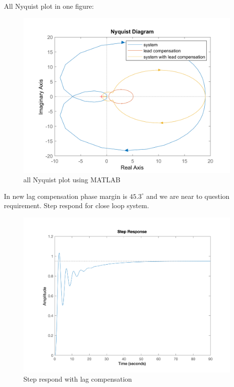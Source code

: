 All Nyquist plot in one figure:
\begin{figure}[H]
	\caption{all Nyquist plot using MATLAB}
	\centering
	\includegraphics[width=12cm]{../Figure/Q1/b/new_all_in_one_nyquist.png}
\end{figure}
In new lag compensation phase margin is $45.3^{\circ}$ and we are near to question requirement.
Step respond for close loop system.
\begin{figure}[H]
	\caption{Step respond with lag compensation}
	\centering
	\includegraphics[width=12cm]{../Figure/Q1/b/step.png}
\end{figure}